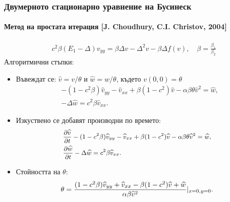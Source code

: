\documentclass{beamer}
\newcommand{\rf}[1]{(\ref{#1})}
\begin{document}

\begin{frame}
\frametitle{Двумерното стационарно уравнение на Бусинеск}
\framesubtitle{Метод на простата итерация [J. Choudhury, C.I. Christov, 2004]} 
 \begin{align}\label{eq3}
&c^2 \beta (E_1- \Delta) v_{{ y}{ y}} = \beta \Delta v - \Delta^2 v - \beta \Delta f(v), \quad \beta = \frac{\beta_1}{\beta_2}
\end{align}
Алгоритмични стъпки:
\begin{itemize} %
  \item Въвеждат се: $\widehat{v}=v/{\theta} $ и $\widehat{w}=w/{\theta} $, където $v(0,0)=\theta$
\begin{align}\label{eq45}
 &- (1 - c^2 \beta) \widehat{v}_{yy} -\widehat{v}_{xx} + \beta (1-c^2) \widehat{v} - \alpha \beta \theta \widehat{v}^2 = \widehat{w}, \\
 &- \Delta \widehat{w} =  c^2 \beta \widehat{v}_{xx}.
\end{align}
  \item Изкуствено се добавят производни по времето:
\begin{align}\label{eq5}
\small
\begin{split}
 &\frac {\partial \widehat{v}}{\partial t} - (1 - c^2 \beta) \widehat{v}_{yy} -\widehat{v}_{xx} + \beta (1-c^2) \widehat{v} - \alpha \beta \theta \widehat{v}^2 = \widehat{w}, \\
 &\frac {\partial \widehat{w}}{\partial t} - \Delta \widehat{w} =  c^2 \beta \widehat{v}_{xx}. 
\end{split}
\end{align}
\item Стойността на $\theta$:
\begin{equation}\label{eqtheta}
\small
\theta = \frac{ (1-c^2 \beta) \widehat{v}_{yy} + \widehat{v}_{xx} - \beta (1-c^2) \widehat{v} +\widehat{w}}{\alpha \beta \widehat{v}^2 } |_{x=0,y=0}.
\end{equation}
\end{itemize}

\end{frame}
\end{document}
